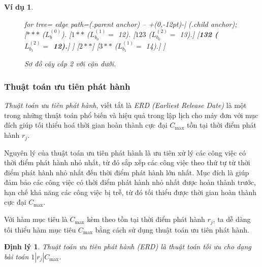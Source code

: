 \documentclass[12pt,a4paper]{report}
\newtheorem{dl}{Định lý}
\newtheorem{vd}{Ví dụ}
\begin{document}
\begin{vd}
\begin{figure}[h!]
	\centering
	\begin{forest} for tree={
		edge path={\noexpand{} (.parent anchor) -- +(0,-12pt)-| (.child anchor);}
	}
	[{$***$ ($L_b^{(0)}$).}
		[{$1**$ ($L_{b_0}^{(1)} =$ 12).}
			[{$123$ ($L_{b_0}^{(2)} =$ 13).}]
			[{\textbf{132 ($L_{b_1}^{(2)} =$ 12).}}]
		]
		[$2**$]
		[{$3**$ ($L_{b_1}^{(1)} =$ 14).}]
	]
	\end{forest}
\caption{\label{vdcmaxcap2canduoi} Sơ đồ cây cấp 2 với cận dưới.}
\end{figure}

\end{vd}

\phantom{text}

\subsubsection*{Thuật toán ưu tiên phát hành}

\textit{Thuật toán ưu tiên phát hành}, viết tắt là \textit{ERD (Earliest Release Date)} là một trong những thuật toán phổ biến và hiệu quả trong lập lịch cho máy đơn với mục đích giúp tối thiểu hoá thời gian hoàn thành cực đại $C_{\max}$ tồn tại thời điểm phát hành $r_j$.

Nguyên lý của thuật toán ưu tiên phát hành là ưu tiên xử lý các công việc có thời điểm phát hành nhỏ nhất, từ đó sắp xếp các công việc theo thứ tự từ thời điểm phát hành nhỏ nhất đến thời điểm phát hành lớn nhất. Mục đích là giúp đảm bảo các công việc có thời điểm phát hành nhỏ nhất được hoàn thành trước, hạn chế khả năng các công việc bị trễ, từ đó tối thiểu được thời gian hoàn thành cực đại $C_{\max}$.

Với hàm mục tiêu là $C_{\max}$ kèm theo tồn tại thời điểm phát hành $r_j$, ta dễ dàng tối thiểu hàm mục tiêu $C_{\max}$ bằng cách sử dụng thuật toán ưu tiên phát hành.

\begin{dl}
	Thuật toán ưu tiên phát hành (ERD) là thuật toán tối ưu cho dạng bài toán $1 | r_j | C_{\max}$.
\end{dl}
\end{document}
